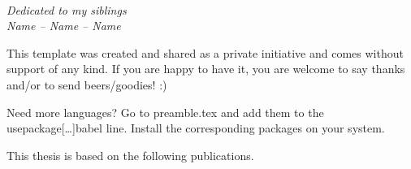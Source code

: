 \documentclass{book}
\begin{document}

\pagestyle{empty}



\newpage
\thispagestyle{empty} %
~
\vspace{140pt}
\begin{flushright}
  \textit{Dedicated to my siblings\\Name -- Name -- Name}
\end{flushright}

\cleardoublepage

\pagestyle{headings}

\setcounter{page}{1} %
\setcounter{tocdepth}{1}

\tableofcontents
{}


\newpage


This template was created and shared as a private initiative and comes without
support of any kind. If you are happy to have it, you are welcome to say thanks
and/or to send beers/goodies! :)

\newpage


Need more languages? Go to preamble.tex and add them to the
usepackage[\ldots]{babel} line. Install the corresponding packages on your
system.


This thesis is based on the following publications.

\begin{description}[leftmargin=!,labelwidth=0.7cm]
  \item[\I]  
  \item[\II] 
  \item[\III] 
  \item[\IV] 
  \item[\V] 
\end{description}
\end{document}
